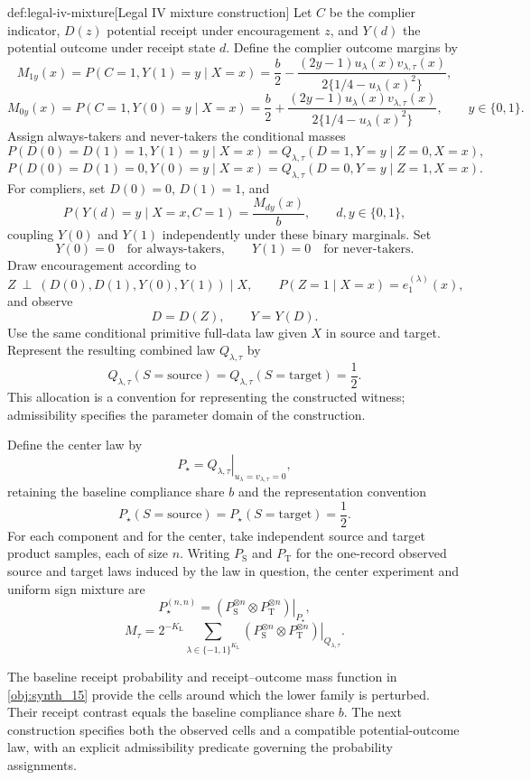 \begin{algorithmv}{def:legal-iv-mixture}[Legal IV mixture construction]
Let \(C\) be the complier indicator, \(D(z)\) potential receipt under encouragement \(z\), and \(Y(d)\) the potential outcome under receipt state \(d\). Define the complier outcome margins by
\[
M_{1y}(x)
=
P(C=1,Y(1)=y\mid X=x)
=
\frac b2
-
\frac{(2y-1)u_{\lambda}(x)v_{\lambda,\tau}(x)}
{2\{1/4-u_{\lambda}(x)^2\}},
\]
\[
M_{0y}(x)
=
P(C=1,Y(0)=y\mid X=x)
=
\frac b2
+
\frac{(2y-1)u_{\lambda}(x)v_{\lambda,\tau}(x)}
{2\{1/4-u_{\lambda}(x)^2\}},
\qquad y\in\{0,1\}.
\]
Assign always-takers and never-takers the conditional masses
\[
P(D(0)=D(1)=1,Y(1)=y\mid X=x)
=
Q_{\lambda,\tau}(D=1,Y=y\mid Z=0,X=x),
\]
\[
P(D(0)=D(1)=0,Y(0)=y\mid X=x)
=
Q_{\lambda,\tau}(D=0,Y=y\mid Z=1,X=x).
\]
For compliers, set \(D(0)=0\), \(D(1)=1\), and
\[
P(Y(d)=y\mid X=x,C=1)
=
\frac{M_{dy}(x)}b,
\qquad d,y\in\{0,1\},
\]
coupling \(Y(0)\) and \(Y(1)\) independently under these binary marginals. Set
\[
Y(0)=0\quad\text{for always-takers},
\qquad
Y(1)=0\quad\text{for never-takers}.
\]
Draw encouragement according to
\[
Z\ \perp\ (D(0),D(1),Y(0),Y(1))\mid X,
\qquad
P(Z=1\mid X=x)=e_1^{(\lambda)}(x),
\]
and observe
\[
D=D(Z),
\qquad
Y=Y(D).
\]
Use the same conditional primitive full-data law given \(X\) in source and target. Represent the resulting combined law \(Q_{\lambda,\tau}\) by
\[
Q_{\lambda,\tau}(S=\mathrm{source})
=
Q_{\lambda,\tau}(S=\mathrm{target})
=
\frac12.
\]
This allocation is a convention for representing the constructed witness; admissibility specifies the parameter domain of the construction.

Define the center law by
\[
P_{\star}
=
\left.Q_{\lambda,\tau}\right|_{u_{\lambda}=v_{\lambda,\tau}=0},
\]
retaining the baseline compliance share \(b\) and the representation convention
\[
P_{\star}(S=\mathrm{source})
=
P_{\star}(S=\mathrm{target})
=
\frac12.
\]
For each component and for the center, take independent source and target product samples, each of size \(n\). Writing \(P_{\mathrm S}\) and \(P_{\mathrm T}\) for the one-record observed source and target laws induced by the law in question, the center experiment and uniform sign mixture are
\[
P_{\star}^{(n,n)}
=
\left.
\left(P_{\mathrm S}^{\otimes n}\otimes P_{\mathrm T}^{\otimes n}\right)
\right|_{P_{\star}},
\]
\[
M_{\tau}
=
2^{-K_{\mathrm L}}
\sum_{\lambda\in\{-1,1\}^{K_{\mathrm L}}}
\left.
\left(P_{\mathrm S}^{\otimes n}\otimes P_{\mathrm T}^{\otimes n}\right)
\right|_{Q_{\lambda,\tau}}.
\]
\end{algorithmv}

The baseline receipt probability  and receipt--outcome mass function  in \cref{obj:synth_15} provide the cells around which the lower family is perturbed. Their receipt contrast equals the baseline compliance share \(b\). The next construction specifies both the observed cells and a compatible potential-outcome law, with an explicit admissibility predicate governing the probability assignments.

